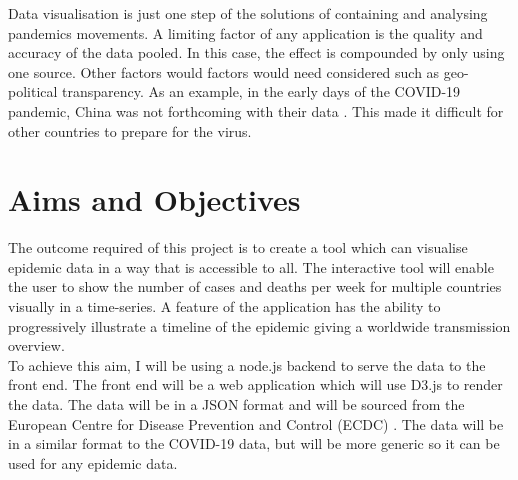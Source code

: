 \documentclass{report}
\begin{document}
Data visualisation is just one step of the solutions of containing and analysing pandemics movements. A limiting factor of any application is the quality and accuracy of the data pooled. In this case, the effect is compounded by only using one source. Other factors would factors would need considered such as geo-political transparency. As an example, in the early days of the COVID-19 pandemic, China was not forthcoming with their data \cite{chinawrongdata:2019}. This made it difficult for other countries to prepare for the virus.\\

\section{Aims and Objectives}
The outcome required of this project is to create a tool which can visualise epidemic data in a way that is accessible to all. The interactive tool will enable the user to show the number of cases and deaths per week for multiple countries visually in a time-series. A feature of the application has the ability to progressively illustrate a timeline of the epidemic giving a worldwide transmission overview.\\

To achieve this aim, I will be using a node.js backend to serve the data to the front end. The front end will be a web application which will use D3.js to render the data. The data will be in a JSON format and will be sourced from the European Centre for Disease Prevention and Control (ECDC) \cite{ecdc}. The data will be in a similar format to the COVID-19 data, but will be more generic so it can be used for any epidemic data.\\
\end{document}

